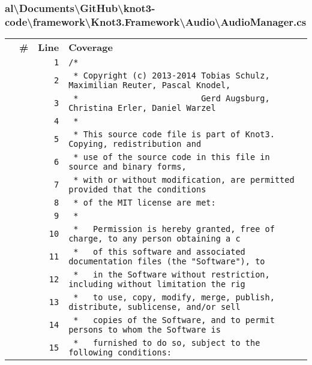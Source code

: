 \documentclass[a4paper,10pt]{article}
\begin{document}
\subsubsection{al\textbackslash Documents\textbackslash GitHub\textbackslash knot3-code\textbackslash framework\textbackslash Knot3.Framework\textbackslash Audio\textbackslash AudioManager.cs}
\begin{longtable}[l]{lrrl}
\textbf{} & \textbf{\#} & \textbf{Line} & \textbf{Coverage}\\
\cellcolor{gray} &  & \verb~1~ & \verb~/*~\\
\cellcolor{gray} &  & \verb~2~ & \verb~ * Copyright (c) 2013-2014 Tobias Schulz, Maximilian Reuter, Pascal Knodel,~\\
\cellcolor{gray} &  & \verb~3~ & \verb~ *                         Gerd Augsburg, Christina Erler, Daniel Warzel~\\
\cellcolor{gray} &  & \verb~4~ & \verb~ *~\\
\cellcolor{gray} &  & \verb~5~ & \verb~ * This source code file is part of Knot3. Copying, redistribution and~\\
\cellcolor{gray} &  & \verb~6~ & \verb~ * use of the source code in this file in source and binary forms,~\\
\cellcolor{gray} &  & \verb~7~ & \verb~ * with or without modification, are permitted provided that the conditions~\\
\cellcolor{gray} &  & \verb~8~ & \verb~ * of the MIT license are met:~\\
\cellcolor{gray} &  & \verb~9~ & \verb~ *~\\
\cellcolor{gray} &  & \verb~10~ & \verb~ *   Permission is hereby granted, free of charge, to any person obtaining a c~\\
\cellcolor{gray} &  & \verb~11~ & \verb~ *   of this software and associated documentation files (the "Software"), to ~\\
\cellcolor{gray} &  & \verb~12~ & \verb~ *   in the Software without restriction, including without limitation the rig~\\
\cellcolor{gray} &  & \verb~13~ & \verb~ *   to use, copy, modify, merge, publish, distribute, sublicense, and/or sell~\\
\cellcolor{gray} &  & \verb~14~ & \verb~ *   copies of the Software, and to permit persons to whom the Software is~\\
\cellcolor{gray} &  & \verb~15~ & \verb~ *   furnished to do so, subject to the following conditions:~\\

\end{longtable}
\end{document}
